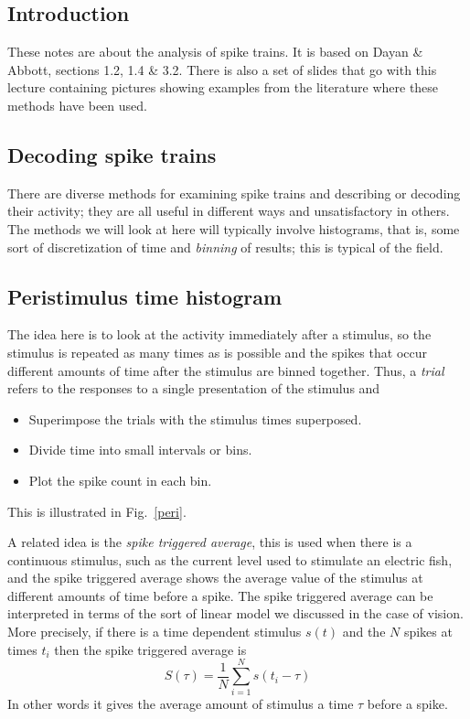 \documentclass[11pt,a4paper]{scrartcl}
\begin{document}
\subsection*{Introduction}
These notes are about the analysis of spike trains. It is based on
Dayan \& Abbott, sections 1.2, 1.4 \& 3.2. There is also a set of
slides that go with this lecture containing pictures showing examples
from the literature where these methods have been used.

\subsection*{Decoding spike trains}
There are diverse methods for examining spike trains and describing or
decoding their activity; they are all useful in different ways and
unsatisfactory in others. The methods we will look at here will
typically involve histograms, that is, some sort of discretization of
time and \textsl{binning} of results; this is typical of the field.

\subsection*{Peristimulus time histogram}
The idea here is to look at the activity immediately after a
stimulus, so the stimulus is repeated as many times as is possible and
the spikes that occur different amounts of time after the stimulus are
binned together. Thus, a \textsl{trial} refers to the responses to a single presentation of the stimulus and
\begin{itemize}
\item Superimpose the trials with the stimulus times superposed.
\item Divide time into small intervals or bins.
\item Plot the spike count in each bin.
\end{itemize}
This is illustrated in Fig.~\ref{peri}. 

A related idea is the \textsl{spike triggered average}, this is used
when there is a continuous stimulus, such as the current level used to
stimulate an electric fish, and the spike triggered average shows the
average value of the stimulus at different amounts of time before a
spike. The spike triggered average can be interpreted in terms of the
sort of linear model we discussed in the case of vision. More
precisely, if there is a time dependent stimulus $s(t)$ and the $N$
spikes at times $t_i$ then the spike triggered average is
\begin{equation}
S(\tau)=\frac{1}{N}\sum_{i=1}^N s(t_i-\tau)
\end{equation}
In other words it gives the average amount of stimulus a time $\tau$
before a spike.
\end{document}
